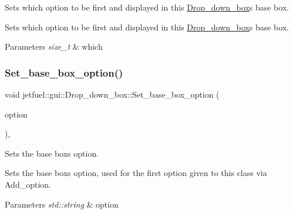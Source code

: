 Sets which option to be first and displayed in this \hyperlink{classjetfuel_1_1gui_1_1Drop__down__box}{Drop\+\_\+down\+\_\+box}\textquotesingle{}s base box. 

Sets which option to be first and displayed in this \hyperlink{classjetfuel_1_1gui_1_1Drop__down__box}{Drop\+\_\+down\+\_\+box}\textquotesingle{}s base box.


\begin{DoxyParams}{Parameters}
{\em size\+\_\+t} & which \\
\hline
\end{DoxyParams}
\mbox{\label{classjetfuel_1_1gui_1_1Drop__down__box_a2fac141eb75af5c59b208753634f2e75}} 
\subsubsection{\texorpdfstring{Set\+\_\+base\+\_\+box\+\_\+option()}{Set\_base\_box\_option()}}
{\footnotesize\ttfamily void jetfuel\+::gui\+::\+Drop\+\_\+down\+\_\+box\+::\+Set\+\_\+base\+\_\+box\+\_\+option (\begin{DoxyParamCaption}\item[{std\+::string}]{option }\end{DoxyParamCaption})\hspace{0.3cm}{\ttfamily [inline]}, {\ttfamily [protected]}}



Sets the base box\textquotesingle{}s option. 

Sets the base box\textquotesingle{}s option, used for the first option given to this class via Add\+\_\+option.


\begin{DoxyParams}{Parameters}
{\em std\+::string} & option \\
\hline
\end{DoxyParams}
\mbox{\label{classjetfuel_1_1gui_1_1Drop__down__box_a051d83177f8fa26325dcbdc504ccb0a9}} 
